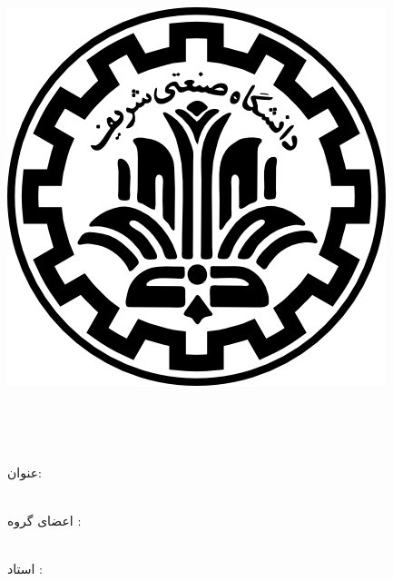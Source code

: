
\pagestyle{empty}

\begin{center}

\includegraphics[scale=0.2]{front/template/images/logo.png}

\begin{Large}

\vspace{-0.2cm}
\ThesisUniversity \\[-0.3em]
\ThesisDepartment

\vspace{0.5cm}

\ThesisType \\[-0.3em]


\end{Large}

\vspace{1cm}

\large{عنوان:}\\[-.5em]
\huge{\textbf{\ThesisTitle}}\\

\vspace{1cm}

\large{اعضای گروه :}\\
\Large{\textbf{\ThesisAuthor}}\\

\vspace{0.7cm}

\large{استاد :}\\ 
\Large{\textbf{\ThesisSupervisor}}\\

\vspace{9cm}

\large{\ThesisDate}

\end{center}

\newpage
